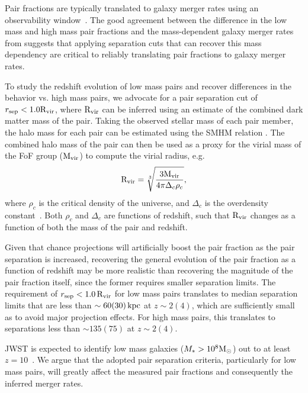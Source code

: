 \documentclass[twocolumn]{aastex631}
\newcommand{\Rvir}{\ensuremath{\rm R_{vir}}}
\begin{document}
    Pair fractions are typically translated to galaxy merger rates using an observability window~\citep{Lotz2011}.
    The good agreement between the difference in the low mass and high mass pair fractions and the mass-dependent galaxy merger rates from \cite{RG2015} suggests that applying separation cuts that can recover this mass dependency are critical to reliably translating pair fractions to galaxy merger rates. 

    To study the redshift evolution of low mass pairs and recover differences in the behavior vs. high mass pairs, we advocate for a pair separation cut of  $r_{\mathrm{sep}} < 1.0\Rvir$, where $\Rvir$ can be inferred using an estimate of the combined dark matter mass of the pair.
    Taking the observed stellar mass of each pair member, the halo mass for each pair can be estimated using the SMHM relation \citep[e.g.,][]{Moster2013}. 
    The combined halo mass of the pair can then be used as a proxy for the virial mass of the FoF group ($\rm M_{vir}$) to compute the virial radius, e.g. 
    \begin{equation}\label{eq}
    \Rvir = \sqrt[3]{\frac{3\rm M_{vir}}{4\pi \Delta_{c}\rho_{c}}},
    \end{equation}
    where $\rho_c$ is the critical density of the universe, and $\Delta_{c}$ is the overdensity constant~\citep[see][]{BinneyTremaine2008}. 
    Both $\rho_c$ and $\Delta_{c}$ are functions of redshift, such that $\Rvir$ changes as a function of both the mass of the pair and redshift.
    
    Given that chance projections will artificially boost the pair fraction as the pair separation is increased, recovering the general evolution of the pair fraction as a function of redshift may be more realistic than recovering the magnitude of the pair fraction itself, since the former requires smaller separation limits. 
    The requirement of $r_{\mathrm{sep}} < 1.0\,\Rvir$ for low mass pairs translates to median separation limits that are less than $\sim 60(30)\mathrm{\,kpc}$ at $z \sim2(4)$, which are sufficiently small as to avoid major projection effects. 
    For high mass pairs, this translates to separations less than $\sim135(75)$ at $z\sim2(4)$.

    JWST is expected to identify low mass galaxies ($M_* > 10^8\mathrm{M}_\odot$) out to at least $z=10$~\citep{Cowley2018,Williams2018,Behroozi2020}. 
    We argue that the adopted pair separation criteria, particularly for low mass pairs, will greatly affect the measured pair fractions and consequently the inferred merger rates. 
\end{document}
